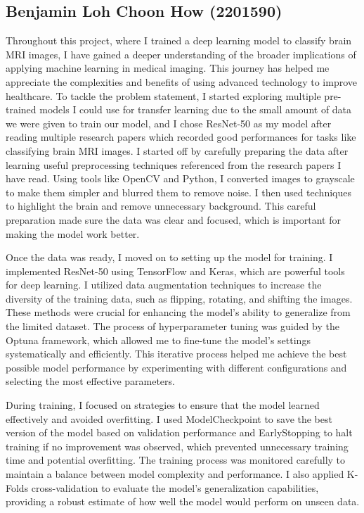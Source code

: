 \subsection{Benjamin Loh Choon How (2201590)}

Throughout this project, where I trained a deep learning model to classify brain MRI images, I have gained a deeper understanding of the broader implications of applying machine learning in medical imaging. This journey has helped me appreciate the complexities and benefits of using advanced technology to improve healthcare. To tackle the problem statement, I started exploring multiple pre-trained models I could use for transfer learning due to the small amount of data we were given to train our model, and I chose ResNet-50 as my model after reading multiple research papers which recorded good performances for tasks like classifying brain MRI images. I started off by carefully preparing the data after learning useful preprocessing techniques referenced from the research papers I have read. Using tools like OpenCV and Python, I converted images to grayscale to make them simpler and blurred them to remove noise. I then used techniques to highlight the brain and remove unnecessary background. This careful preparation made sure the data was clear and focused, which is important for making the model work better.

Once the data was ready, I moved on to setting up the model for training. I implemented ResNet-50 using TensorFlow and Keras, which are powerful tools for deep learning. I utilized data augmentation techniques to increase the diversity of the training data, such as flipping, rotating, and shifting the images. These methods were crucial for enhancing the model’s ability to generalize from the limited dataset. The process of hyperparameter tuning was guided by the Optuna framework, which allowed me to fine-tune the model's settings systematically and efficiently. This iterative process helped me achieve the best possible model performance by experimenting with different configurations and selecting the most effective parameters.

During training, I focused on strategies to ensure that the model learned effectively and avoided overfitting. I used ModelCheckpoint to save the best version of the model based on validation performance and EarlyStopping to halt training if no improvement was observed, which prevented unnecessary training time and potential overfitting. The training process was monitored carefully to maintain a balance between model complexity and performance. I also applied K-Folds cross-validation to evaluate the model's generalization capabilities, providing a robust estimate of how well the model would perform on unseen data.

